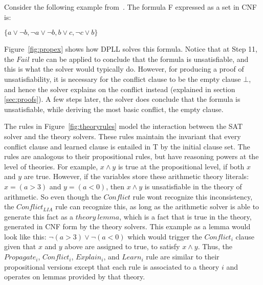 \documentclass{article}
\begin{document}
Consider the following example from~\cite{DBLP:conf/fmcad/KatzBTRH16}.
The formula F expressed as a set in CNF is:
\begin{center}
$\{a \lor \neg b, \neg a \lor \neg b, b \lor c, \neg c \lor b\}$
\end{center}
Figure~\ref{fig:propex} shows how DPLL solves this 
formula. Notice that at Step 11, the $Fail$ rule can be 
applied to conclude that the formula is unsatisfiable, and 
this is what the solver would typically do. However, for 
producing a proof of unsatisfiability, it is necessary for the 
conflict clause to be the empty clause $\bot$, and hence the 
solver explains on the conflict instead (explained in 
section \ref{sec:proofs}). A few steps later, 
the solver does conclude that the formula is unsatisfiable, 
while deriving the most basic conflict, the empty clause.

The rules in Figure~\ref{fig:theoryrules} model the 
interaction between the SAT solver and the theory solvers.
These rules maintain the invariant that every 
conflict clause and learned 
clause is entailed in T by the initial clause set.
The rules are analogous to their propositional rules, but 
have reasoning powers at the level of theories. For example, 
$x \land y$ is true at the propositional level, if both 
$x$ and $y$ are true. However, if the variables store these 
arithmetic theory literals: \\
$x = (a > 3)$ and $y = (a < 0)$, then $x \land y$ is 
unsatisfiable in the theory of arithmetic. So even though 
the $Conflict$ rule wont recognize this inconsistency, 
the $Conflict_{LIA}$ rule can recognize this, as long as 
the arithmetic solver is able to generate this fact as a 
$theory\ lemma$, which is a fact that is true in the theory, 
generated in CNF form by the theory solvers. This example
as a lemma would look like this:
$\neg (a > 3) \lor \neg (a < 0)$ which would trigger the 
$Conflict_i$ clause given that $x$ and $y$ above are assigned 
to true, to satisfy $x \land y$. Thus, the $Propagate_i$, 
$Conflict_i$, $Explain_i$, and $Learn_i$ rule are similar 
to their propositional versions except that each rule is 
associated to a theory $i$ and operates on lemmas 
provided by that theory. 
\end{document}
